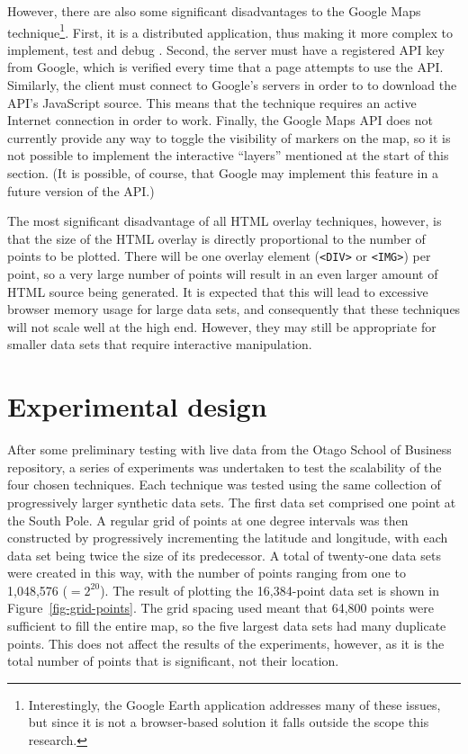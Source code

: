 \documentclass[acmnow]{acmtrans2m}
\begin{document}
However, there are also some significant disadvantages to the Google
Maps technique\footnote{Interestingly, the Google Earth application
addresses many of these issues, but since it is not a browser-based
solution it falls outside the scope this research.}. First, it is a
distributed application, thus making it more complex to implement, test
and debug \cite{Bates-PC-1995-distdebug,Ensl-PH-1978-distributed}.
Second, the server must have a registered API key from Google, which is
verified every time that a page attempts to use the API. Similarly, the
client must connect to Google's servers in order to to download the
API's JavaScript source. This means that the technique requires an
active Internet connection in order to work. Finally, the Google Maps
API does not currently provide any way to toggle the visibility of
markers on the map, so it is not possible to implement the interactive
``layers'' mentioned at the start of this section. (It is possible, of
course, that Google may implement this feature in a future version of
the API.)

The most significant disadvantage of all HTML overlay techniques,
however, is that the size of the HTML overlay is directly proportional
to the number of points to be plotted. There will be one overlay element
(\verb|<DIV>| or \verb|<IMG>|) per point, so a very large number of
points will result in an even larger amount of HTML source being
generated. It is expected that this will lead to excessive browser
memory usage for large data sets, and consequently that these techniques
will not scale well at the high end. However, they may still be
appropriate for smaller data sets that require interactive manipulation.


\section{Experimental design}
\label{sec-experiment}

After some preliminary testing with live data from the Otago School of
Business repository, a series of experiments was undertaken to test the
scalability of the four chosen techniques. Each technique was tested
using the same collection of progressively larger synthetic data sets.
The first data set comprised one point at the South Pole. A regular grid
of points at one degree intervals was then constructed by progressively
incrementing the latitude and longitude, with each data set being twice
the size of its predecessor. A total of twenty-one data sets were
created in this way, with the number of points ranging from one to
1,048,576 (\(=2^{20}\)). The result of plotting the 16,384-point data
set is shown in Figure~\ref{fig-grid-points}. The grid spacing used
meant that 64,800 points were sufficient to fill the entire map, so the
five largest data sets had many duplicate points. This does not affect
the results of the experiments, however, as it is the total number of
points that is significant, not their location.
\end{document}
